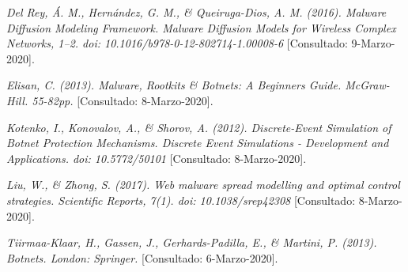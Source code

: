 \documentclass[12pt]{extreport}
\begin{document}
    \begin{thebibliography}{1}	
    	\textit{Del Rey, Á. M., Hernández, G. M., \& Queiruga-Dios, A. M. (2016). Malware Diffusion Modeling Framework. Malware Diffusion Models for Wireless Complex Networks, 1–2. doi: 10.1016/b978-0-12-802714-1.00008-6}
    	[Consultado: 9-Marzo-2020].
    	
    	\textit{Elisan, C. (2013). Malware, Rootkits \& Botnets: A Beginners Guide. McGraw-Hill. 55-82pp.}
    	[Consultado: 8-Marzo-2020].
    	
    	\textit{Kotenko, I., Konovalov, A., \& Shorov, A. (2012). Discrete-Event Simulation of Botnet Protection Mechanisms. Discrete Event Simulations - Development and Applications. doi: 10.5772/50101}
    	[Consultado: 8-Marzo-2020].
    	
    	\textit{Liu, W., \& Zhong, S. (2017). Web malware spread modelling and optimal control strategies. Scientific Reports, 7(1). doi: 10.1038/srep42308}
    	[Consultado: 8-Marzo-2020].
    	
    	\textit{Tiirmaa-Klaar, H., Gassen, J., Gerhards-Padilla, E., \& Martini, P. (2013). Botnets. London: Springer.}
    	[Consultado: 6-Marzo-2020].
    \end{thebibliography}
\end{document}
